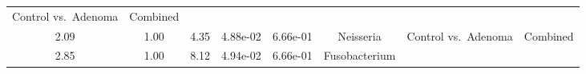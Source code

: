 \documentclass[12pt,]{article}
\begin{document}
\begin{longtable}[]{@{}cccccccc@{}}
\begin{minipage}[t]{0.14\columnwidth}
Control vs.~Adenoma\strut
\end{minipage} & \begin{minipage}[t]{0.09\columnwidth}\centering\strut
Combined\strut
\end{minipage}\tabularnewline
\begin{minipage}[t]{0.05\columnwidth}\centering\strut
2.09\strut
\end{minipage} & \begin{minipage}[t]{0.09\columnwidth}\centering\strut
1.00\strut
\end{minipage} & \begin{minipage}[t]{0.09\columnwidth}\centering\strut
4.35\strut
\end{minipage} & \begin{minipage}[t]{0.07\columnwidth}\centering\strut
4.88e-02\strut
\end{minipage} & \begin{minipage}[t]{0.07\columnwidth}\centering\strut
6.66e-01\strut
\end{minipage} & \begin{minipage}[t]{0.20\columnwidth}\centering\strut
Neisseria\strut
\end{minipage} & \begin{minipage}[t]{0.14\columnwidth}\centering\strut
Control vs.~Adenoma\strut
\end{minipage} & \begin{minipage}[t]{0.09\columnwidth}\centering\strut
Combined\strut
\end{minipage}\tabularnewline
\begin{minipage}[t]{0.05\columnwidth}\centering\strut
2.85\strut
\end{minipage} & \begin{minipage}[t]{0.09\columnwidth}\centering\strut
1.00\strut
\end{minipage} & \begin{minipage}[t]{0.09\columnwidth}\centering\strut
8.12\strut
\end{minipage} & \begin{minipage}[t]{0.07\columnwidth}\centering\strut
4.94e-02\strut
\end{minipage} & \begin{minipage}[t]{0.07\columnwidth}\centering\strut
6.66e-01\strut
\end{minipage} & \begin{minipage}[t]{0.20\columnwidth}\centering\strut
Fusobacterium\strut
\end{minipage} & \begin{minipage}[t]{0.14\columnwidth}\centering\strut

\end{minipage}
\end{longtable}
\end{document}
